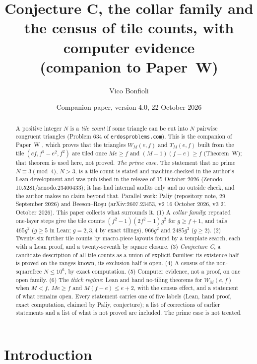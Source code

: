 \documentclass[11pt,reqno]{amsart}
\title[Conjecture C, the collar family and the census]{Conjecture C, the collar family and the census of tile counts, with computer evidence\\ (companion to Paper~W)}
\author{Vico Bonfioli}
\date{Companion paper, version 4.0, 22 October 2026}
\theoremstyle{plain}
\theoremstyle{definition}
\begin{document}
\begin{abstract}
A positive integer $N$ is a \emph{tile count} if some triangle can be cut into $N$ pairwise congruent triangles (Problem 634 of \texttt{erdosproblems.com}). This is the companion of Paper~W \cite{PaperW}, which proves that the triangles $W_M(e,f)$ and $T_M(e,f)$ built from the tile $(ef,f^2-e^2,f^2)$ are tiled once $Me\ge f$ and $(M-1)(f-e)\ge f$ (Theorem~W); that theorem is used here, not proved. \emph{The prime case.} The statement that no prime $N\equiv3\pmod4$, $N>3$, is a tile count is stated and machine-checked in the author's Lean development and was published in the release of 15 October 2026 (Zenodo 10.5281/zenodo.23400433); it has had internal audits only and no outside check, and the author makes no claim beyond that. Parallel work: Paliy (repository note, 29 September 2026) and Beeson--Ro\c{s}u (arXiv:2607.23453, v2 16 October 2026, v3 21 October 2026).
This paper collects what surrounds it. (1) A \emph{collar family}: repeated one-layer steps give the tile counts $(f^2-1)(2f^2-1)g^2$ for $g\ge f+1$, and tails $465g^2$ ($g\ge5$ in Lean; $g=2,3,4$ by exact tilings), $966g^2$ and $2485g^2$ ($g\ge2$). (2) Twenty-six further tile counts by macro-piece layouts found by a template search, each with a Lean proof, and a twenty-seventh by square closure. (3) \emph{Conjecture C}, a candidate description of all tile counts as a union of explicit families: its existence half is proved on the ranges known, its exclusion half is open. (4) A census of the non-squarefree $N\le10^6$, by exact computation. (5) Computer evidence, not a proof, on one open family. (6) The \emph{thick regime}: Lean and hand no-tiling theorems for $W_M(e,f)$ when $M<f$, $Me\ge f$ and $M(f-e)\le e+2$, with the census effect, and a statement of what remains open. Every statement carries one of five labels (Lean, hand proof, exact computation, claimed by Paliy, conjecture); a list of corrections of earlier statements and a list of what is not proved are included. The prime case is not treated.
\end{abstract}
\maketitle

\section{Introduction}\label{sec:intro}
\end{document}
